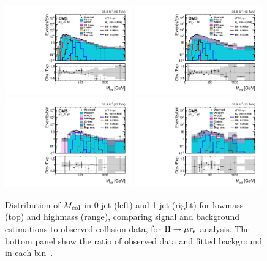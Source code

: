 \begin{figure}[!htpb]\centering
 \includegraphics[width=0.49\textwidth]{plots_and_figures/chapter8/highmass/log_low_me_ch1_HMuTau_mutaue_1_2016_postfit_colmass_postfit.pdf}
 \includegraphics[width=0.49\textwidth]{plots_and_figures/chapter8/highmass/log_low_me_ch1_HMuTau_mutaue_2_2016_postfit_colmass_postfit.pdf} \\
 \includegraphics[width=0.49\textwidth]{plots_and_figures/chapter8/highmass/log_high_me_ch1_HMuTau_mutaue_1_2016_postfit_colmass_postfit.pdf}
 \includegraphics[width=0.49\textwidth]{plots_and_figures/chapter8/highmass/log_high_me_ch1_HMuTau_mutaue_2_2016_postfit_colmass_postfit.pdf} 
\caption{Distribution of $M_{\text{col}}$ in 0-jet (left) and 1-jet (right) for lowmass (top) and highmass (range), comparing signal and background estimations to observed collision data, for $\text{H} \to \mu \tau_{e}$ analysis. The bottom panel show the ratio of observed data and fitted background in each bin~\cite{HIG-18-017}.}
 \label{fig:mcol_dist_Hmue}
\end{figure}



